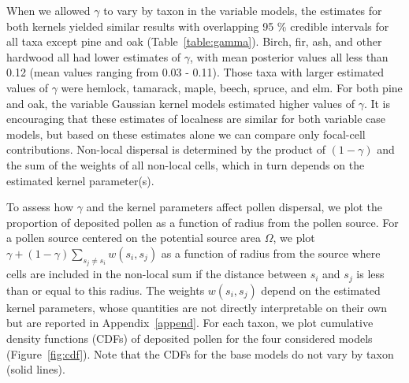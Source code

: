 \documentclass[12pt]{article}
\begin{document}
When we allowed $\gamma$ to vary by taxon in the variable models, the
estimates for both kernels yielded similar results with overlapping 95
\% credible intervals for all taxa except pine and oak
(Table~\ref{table:gamma}). Birch, fir, ash, and other
hardwood all had lower estimates of $\gamma$, with mean posterior
values all less than 0.12 (mean values ranging from 0.03 -
0.11). Those taxa with larger estimated values of $\gamma$ were
hemlock, tamarack, maple, beech, spruce, and elm. For both pine and
oak, the variable Gaussian kernel models estimated higher values of
$\gamma$. It is encouraging that these estimates of localness are
similar for both variable case models, but based on these estimates
alone we can compare only focal-cell contributions. Non-local
dispersal is determined by the product of $(1-\gamma)$ and the sum of
the weights of all non-local cells, which in turn depends on the
estimated kernel parameter(s).


To assess how $\gamma$ and the kernel parameters affect pollen
dispersal, we plot the proportion of deposited pollen as a function of
radius from the pollen source. For a pollen source centered on the
potential source area $\Omega$, we plot $\gamma + (1- \gamma)
\sum_{s_j \neq s_i} w(s_i, s_j)$ as a function of radius from the
source where cells are included in the non-local sum if the distance
between $s_i$ and $s_j$ is less than or equal to this radius. The
weights $w(s_i, s_j)$ depend on the estimated kernel parameters, whose
quantities are not directly interpretable on their own but are
reported in Appendix~\ref{append}. For each taxon, we plot cumulative
density functions (CDFs) of deposited pollen for the four considered
models (Figure~\ref{fig:cdf}). Note that the CDFs for the base models
do not vary by taxon (solid lines).
\end{document}
